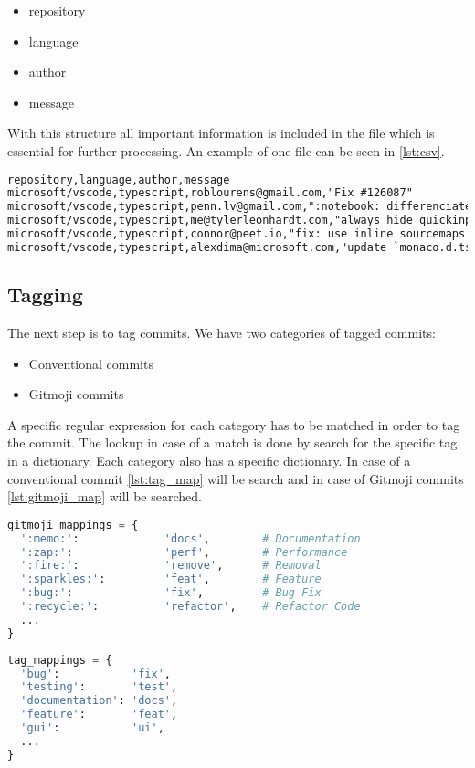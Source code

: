\begin{itemize}
  \item repository
  \item language
  \item author
  \item message
\end{itemize}

With this structure all important information is included in the file which is
essential for further processing. An example of one file can be seen in
\autoref{lst:csv}.

\begin{lstlisting}[language=xml, label={lst:csv}, caption={Excerpt of \textit{typescript.csv} with commits from the repository \textit{microsoft/vscode}}]
repository,language,author,message
microsoft/vscode,typescript,roblourens@gmail.com,"Fix #126087"
microsoft/vscode,typescript,penn.lv@gmail.com,":notebook: differenciate editor focus and list view focus"
microsoft/vscode,typescript,me@tylerleonhardt.com,"always hide quickinput on iPad when focus is lost fixes #125284"
microsoft/vscode,typescript,connor@peet.io,"fix: use inline sourcemaps in watch task"
microsoft/vscode,typescript,alexdima@microsoft.com,"update `monaco.d.ts`"
\end{lstlisting}

\subsection{Tagging}

The next step is to tag commits. We have two categories of tagged commits:

\begin{itemize}
  \item Conventional commits
  \item Gitmoji commits
\end{itemize}

A specific regular expression for each category has to be matched in order to
tag the commit. The lookup in case of a match is done by search for the
specific tag in a dictionary. Each category also has a specific dictionary. In
case of a conventional commit \autoref{lst:tag_map} will be search and in case of
Gitmoji commits \autoref{lst:gitmoji_map} will be searched.

\begin{lstlisting}[language=python, label={lst:gitmoji_map}, caption={Dictionary for Gitmoji mappings}]
gitmoji_mappings = {
  ':memo:':             'docs',        # Documentation
  ':zap:':              'perf',        # Performance
  ':fire:':             'remove',      # Removal
  ':sparkles:':         'feat',        # Feature
  ':bug:':              'fix',         # Bug Fix
  ':recycle:':          'refactor',    # Refactor Code
  ...
}
\end{lstlisting}

\begin{lstlisting}[language=python, label={lst:tag_map}, caption={Dictionary for conventional tag mappings}]
tag_mappings = {
  'bug':           'fix',
  'testing':       'test',
  'documentation': 'docs',
  'feature':       'feat',
  'gui':           'ui',
  ...
}
\end{lstlisting}
